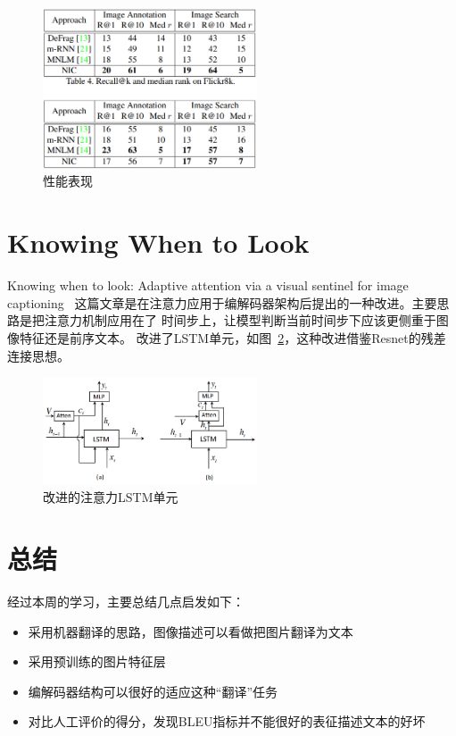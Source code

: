 \documentclass[UTF8]{ctexart}
\begin{document}
\begin{figure}
    \centering
    \includegraphics[width=2.5in]{111}
    \caption{性能表现}
    \label{fig:2}
\end{figure}

\section{Knowing When to Look}
Knowing when to look: Adaptive attention via a visual sentinel for image captioning~\cite{when}
这篇文章是在注意力应用于编解码器架构后提出的一种改进。主要思路是把注意力机制应用在了
时间步上，让模型判断当前时间步下应该更侧重于图像特征还是前序文本。
改进了LSTM单元，如图~\ref{fig:3}，这种改进借鉴Resnet的残差连接思想。


\begin{figure}
    \centering
    \includegraphics[width=2.5in]{attn_lstm.png}
    \caption{改进的注意力LSTM单元}
    \label{fig:3}
\end{figure}


\section{总结}
经过本周的学习，主要总结几点启发如下：
\begin{itemize}
    \item 采用机器翻译的思路，图像描述可以看做把图片翻译为文本
    \item 采用预训练的图片特征层
    \item 编解码器结构可以很好的适应这种“翻译”任务
    \item 对比人工评价的得分，发现BLEU指标并不能很好的表征描述文本的好坏
\end{itemize}
\end{document}
